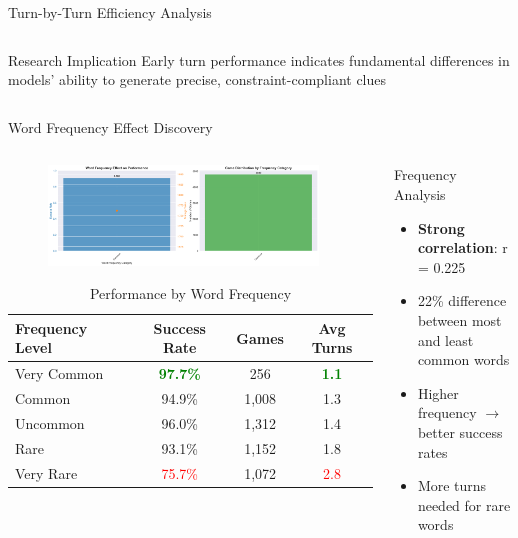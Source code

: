 \documentclass[aspectratio=169]{beamer}
\begin{document}
\begin{frame}{Turn-by-Turn Efficiency Analysis}
\begin{columns}
\begin{column}{0.5\textwidth}
\begin{alertblock}{Research Implication}
Early turn performance indicates fundamental differences in models' ability to generate precise, constraint-compliant clues
\end{alertblock}
\end{column}
\end{columns}
\end{frame}

\begin{frame}{Word Frequency Effect Discovery}
\begin{columns}
\begin{column}{0.5\textwidth}
\begin{figure}[h]
\centering
\includegraphics[width=0.95\textwidth]{comprehensive_figures/figure4_frequency.png}
\end{figure}

\vspace{0.5cm}
\begin{table}
\centering
\scriptsize
\begin{tabular}{lccc}
\toprule
\textbf{Frequency Level} & \textbf{Success Rate} & \textbf{Games} & \textbf{Avg Turns} \\
\midrule
Very Common & \textcolor{green}{\textbf{97.7\%}} & 256 & \textcolor{green}{\textbf{1.1}} \\
Common & 94.9\% & 1,008 & 1.3 \\
Uncommon & 96.0\% & 1,312 & 1.4 \\
Rare & 93.1\% & 1,152 & 1.8 \\
Very Rare & \textcolor{red}{75.7\%} & 1,072 & \textcolor{red}{2.8} \\
\bottomrule
\end{tabular}
\caption{Performance by Word Frequency}
\end{table}
\end{column}

\begin{column}{0.5\textwidth}
\begin{block}{Frequency Analysis}
\begin{itemize}
    \item \textbf{Strong correlation}: r = 0.225
    \item 22\% difference between most and least common words
    \item Higher frequency $\rightarrow$ better success rates
    \item More turns needed for rare words
\end{itemize}
\end{block}


\end{column}
\end{columns}
\end{frame}
\end{document}
